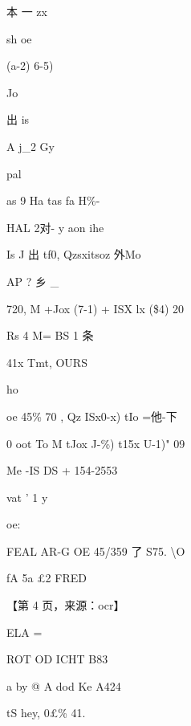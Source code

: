 \documentclass[UTF8,12pt,a4paper,openany]{ctexbook}
\begin{document}
\begin{enumerate}[label=\textbf{\arabic*.},leftmargin=2em]
本   一   zx\par sh          oe\par (a-2)                        6-5)\par Jo\par 出           is\par A j\_2 Gy\par pal\par as 9 Ha tas fa H\%-\par HAL 2对- y aon ihe\par Is   J    出 tf0, Qzsxitsoz 外Mo\par AP ?             乡      \_\par 720, M +Jox (7-1) + ISX lx (\$4) 20\par Rs 4                M= BS 1 条\par 41x Tmt, OURS\par ho\par oe       45\% 70 , Qz ISx0-x) tIo =他-下\par 0 oot            To M tJox J-\%) t15x U-1)" 09\par Me -IS DS + 154-2553\par vat ' 1 y\par oe:\par FEAL AR-G OE 45/359 了                               S75. \textbackslash{}O\par fA 5a £2 FRED\par \par 【第 4 页，来源：ocr】\par ELA     =\par ROT OD ICHT B83\par a by @ A dod Ke A424\par tS hey, 0£\% 41.
\end{enumerate}
\end{document}
